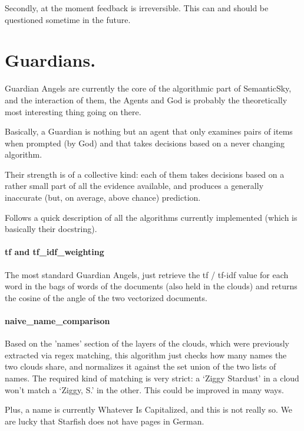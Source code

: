 \documentclass[11pt]{article}
\begin{document}
Secondly, at the moment feedback is irreversible. This can and should be questioned sometime in the future.




\section{Guardians.}

Guardian Angels are currently the core of the algorithmic part of SemanticSky, and the interaction of them, the Agents and God is probably the theoretically most interesting thing going on there.

Basically, a Guardian is nothing but an agent that only examines pairs of items when prompted (by God) and that takes decisions based on a never changing algorithm.

Their strength is of a collective kind: each of them takes decisions based on a rather small part of all the evidence available, and produces a generally inaccurate (but, on average, above chance) prediction.

Follows a quick description of all the algorithms currently implemented (which is basically their docstring).


\paragraph{tf and tf\_idf\_weighting}

The most standard Guardian Angels, just retrieve the tf / tf-idf value for each word in the bags of words of the documents (also held in the clouds) and returns the cosine of the angle of the two vectorized documents.

\paragraph{naive\_name\_comparison}

Based on the 'names' section of the layers of the clouds, which were previously extracted via regex matching, this algorithm just checks how many names the two clouds share, and normalizes it against the set union of the two lists of names.
The required kind of matching is very strict: a `Ziggy Stardust' in a cloud won't match a `Ziggy, S.' in the other. This could be improved in many ways.

Plus, a name is currently Whatever Is Capitalized, and this is not really so. We are lucky that Starfish does not have pages in German.
\end{document}
